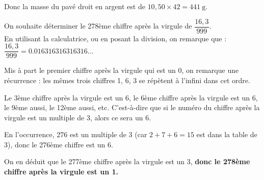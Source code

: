 \documentclass[addpoints,12pt]{exam}
\begin{document}
\begin{questions}
    \begin{center}
    \end{center}

    Donc la masse du pavé droit en argent est de $10,50 \times 42 = \qty{441}{\g}$.

    \question On souhaite déterminer le 278ème chiffre après la virgule de $\dfrac{16,3}{999}$.\\

    En utilisant la calculatrice, ou en posant la division, on remarque que :
    $\dfrac{16,3}{999} = \num{0,016 316 316 316 316}...$

    Mis à part le premier chiffre après la virgule qui est un 0, on remarque une récurrence : les mêmes trois chiffres 1, 6, 3 se répètent à l'infini dans cet ordre.

    Le 3ème chiffre après la virgule est un 6, le 6ème chiffre après la virgule est un 6, le 9ème aussi, le 12ème aussi, etc. C'est-à-dire que si le numéro du chiffre après la virgule est un multiple de 3, alors ce sera un 6.

    En l'occurrence, 276 est un multiple de 3 (car $2 + 7 + 6 = 15$ est dans la table de 3), donc le 276ème chiffre est un 6.

    On en déduit que le 277ème chiffre après la virgule est un 3, \textbf{donc le 278ème chiffre après la virgule est un 1.}
    
\end{questions}
\end{document}
